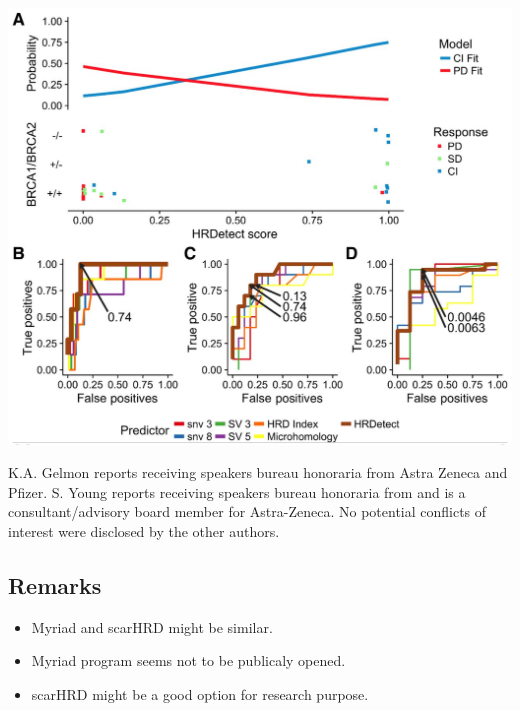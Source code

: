 \documentclass[
]{article}
\providecommand{\tightlist}{%
  \setlength{\itemsep}{0pt}\setlength{\parskip}{0pt}}
\begin{document}
\includegraphics{img/HRDtools.png}

K.A. Gelmon reports receiving speakers bureau honoraria from Astra
Zeneca and Pfizer. S. Young reports receiving speakers bureau honoraria
from and is a consultant/advisory board member for Astra-Zeneca. No
potential conflicts of interest were disclosed by the other authors.

\pagebreak

\hypertarget{remarks}{%
\subsection{Remarks}\label{remarks}}

\begin{itemize}
\tightlist
\item
  Myriad and scarHRD might be similar.
\item
  Myriad program seems not to be publicaly opened.
\item
  scarHRD might be a good option for research purpose.
\end{itemize}
\end{document}

